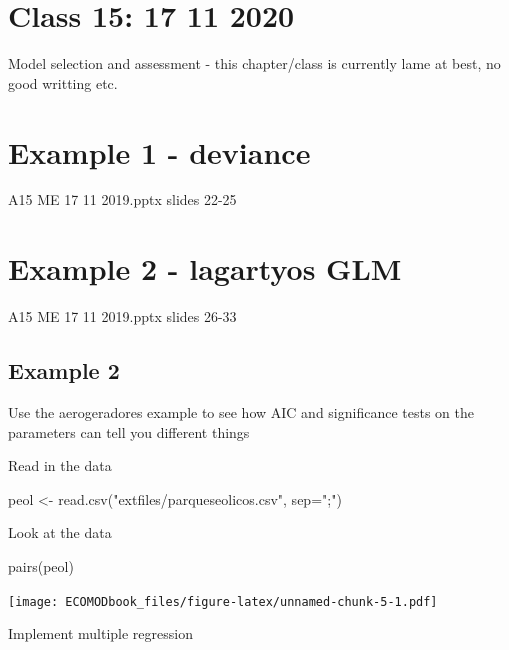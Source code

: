 \documentclass[
]{book}
\newenvironment{Shaded}{\begin{snugshade}}{\end{snugshade}}
\newcommand{\AttributeTok}[1]{\textcolor[rgb]{0.77,0.63,0.00}{#1}}
\newcommand{\FunctionTok}[1]{\textcolor[rgb]{0.00,0.00,0.00}{#1}}
\newcommand{\NormalTok}[1]{#1}
\newcommand{\OtherTok}[1]{\textcolor[rgb]{0.56,0.35,0.01}{#1}}
\newcommand{\StringTok}[1]{\textcolor[rgb]{0.31,0.60,0.02}{#1}}
\begin{document}
\hypertarget{aula15}{%
\chapter{Class 15: 17 11 2020}\label{aula15}}

Model selection and assessment - this chapter/class
is currently lame at best, no good writting etc.

\hypertarget{example-1---deviance}{%
\chapter{Example 1 - deviance}\label{example-1---deviance}}

A15 ME 17 11 2019.pptx
slides 22-25

\hypertarget{example-2---lagartyos-glm}{%
\chapter{Example 2 - lagartyos GLM}\label{example-2---lagartyos-glm}}

A15 ME 17 11 2019.pptx
slides 26-33

\hypertarget{example-2}{%
\section{Example 2}\label{example-2}}

Use the aerogeradores example to see how AIC and significance tests on the parameters can tell you different things

Read in the data

\begin{Shaded}
\begin{Highlighting}[]
\NormalTok{peol }\OtherTok{\textless{}{-}} \FunctionTok{read.csv}\NormalTok{(}\StringTok{"extfiles/parqueseolicos.csv"}\NormalTok{, }\AttributeTok{sep=}\StringTok{";"}\NormalTok{)}
\end{Highlighting}
\end{Shaded}

Look at the data

\begin{Shaded}
\begin{Highlighting}[]
\FunctionTok{pairs}\NormalTok{(peol)}
\end{Highlighting}
\end{Shaded}

\texttt{[image: ECOMODbook\_files/figure-latex/unnamed-chunk-5-1.pdf]}

Implement multiple regression
\end{document}
